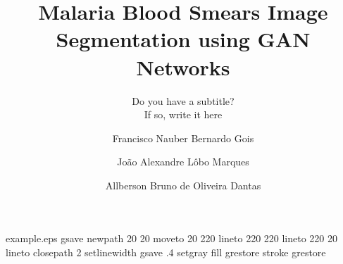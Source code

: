 %
%
%
%
%
\begin{filecontents*}{example.eps}
gsave
newpath
  20 20 moveto
  20 220 lineto
  220 220 lineto
  220 20 lineto
closepath
2 setlinewidth
gsave
  .4 setgray fill
grestore
stroke
grestore
\end{filecontents*}
%
\RequirePackage{fix-cm}
%
\documentclass[twocolumn]{svjour3}          %
%
\smartqed  %
%
\usepackage{graphicx}
\usepackage[table,xcdraw]{xcolor}
%
%
%
%
%


\title{Malaria Blood Smears Image Segmentation using GAN Networks}
\subtitle{Do you have a subtitle?\\ If so, write it here}


\author{Francisco Nauber Bernardo Gois         \and
        João Alexandre Lôbo Marques \and
        Allberson Bruno de Oliveira Dantas \and 
}



